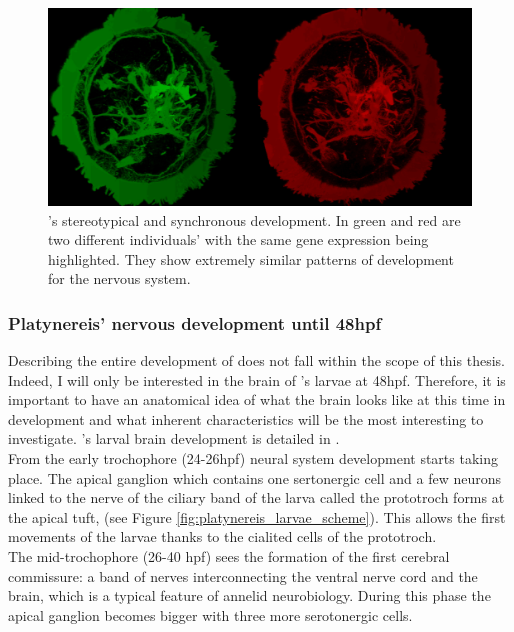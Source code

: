 \begin{figure}[bth]
  \includegraphics[width=\linewidth]{gfx/chapter1/brain_comparison.png}
  \caption{\platyfull{}'s stereotypical and synchronous development. In green and red are two different \platy{} individuals' with the same gene expression being highlighted. They show extremely similar patterns of development for the nervous system.}
  \label{fig:brain_comparison}
\end{figure}

	 
	 	 \subsubsection{Platynereis' nervous development until 48hpf}
	 Describing the entire development of \platy{} does not fall within the scope of this thesis. Indeed, I will only be interested in the brain of \platy{}'s larvae at 48hpf. Therefore, it is important to have an anatomical idea of what the brain looks like at this time in development and what inherent characteristics will be the most interesting to investigate. \platy{}'s larval brain development is detailed in \citep{Fischer10}.\\
	 
     From the early trochophore (24-26hpf) neural system development starts taking place. The apical ganglion which contains one sertonergic cell and a few neurons linked to the nerve of the ciliary band of the larva called the prototroch forms at the apical tuft, (see Figure \ref{fig:platynereis_larvae_scheme}). This allows the first movements of the larvae thanks to the cialited cells of the prototroch.\\
     
     The mid-trochophore (26-40 hpf) sees the formation of the first cerebral commissure: a band of nerves interconnecting the ventral nerve cord and the brain, which is a typical feature of annelid neurobiology. During this phase the apical ganglion becomes bigger with three more serotonergic cells.\\
     
